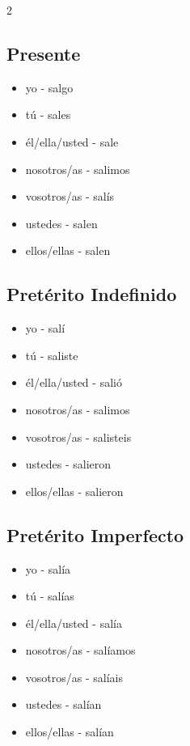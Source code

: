 \documentclass[12pt,a4paper]{article}
\begin{document}
\begin{multicols}{2}

\subsection*{Presente}
\begin{itemize}[leftmargin=*]
    \item yo - salgo
    \item tú - sales
    \item él/ella/usted - sale
    \item nosotros/as - salimos
    \item vosotros/as - salís
    \item ustedes - salen
    \item ellos/ellas - salen
\end{itemize}

\subsection*{Pretérito Indefinido}
\begin{itemize}[leftmargin=*]
    \item yo - salí
    \item tú - saliste
    \item él/ella/usted - salió
    \item nosotros/as - salimos
    \item vosotros/as - salisteis
    \item ustedes - salieron
    \item ellos/ellas - salieron
\end{itemize}

\subsection*{Pretérito Imperfecto}
\begin{itemize}[leftmargin=*]
    \item yo - salía
    \item tú - salías
    \item él/ella/usted - salía
    \item nosotros/as - salíamos
    \item vosotros/as - salíais
    \item ustedes - salían
    \item ellos/ellas - salían
\end{itemize}


\end{multicols}
\end{document}
